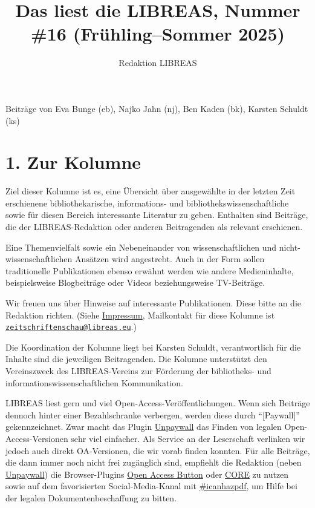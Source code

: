 \documentclass[a4paper,
fontsize=11pt,
oneside,
numbers=noperiodatend,
parskip=half-,
bibliography=totoc,
final
]{scrartcl}
\title{\LARGE{Das liest die LIBREAS, Nummer \#16 (Frühling–Sommer 2025)}}%
\author{Redaktion LIBREAS} %
\date{}
\begin{document}
\maketitle
\thispagestyle{fancyplain} 


Beiträge von Eva Bunge (eb), Najko Jahn (nj), Ben Kaden (bk), Karsten
Schuldt (ks)

\section{1. Zur Kolumne}\label{zur-kolumne}

Ziel dieser Kolumne ist es, eine Übersicht über ausgewählte in der
letzten Zeit erschienene bibliothekarische, informations- und
bibliothekswissenschaftliche sowie für diesen Bereich interessante
Literatur zu geben. Enthalten sind Beiträge, die der LIBREAS-Redaktion
oder anderen Beitragenden als relevant erschienen.

Eine Themenvielfalt sowie ein Nebeneinander von wissenschaftlichen und
nicht-wissenschaftlichen Ansätzen wird angestrebt. Auch in der Form
sollen traditionelle Publikationen ebenso erwähnt werden wie andere
Medieninhalte, beispielsweise Blogbeiträge oder Videos beziehungsweise
TV-Beiträge.

Wir freuen uns über Hinweise auf interessante Publikationen. Diese bitte
an die Redaktion richten. (Siehe
\href{http://libreas.eu/about/}{Impressum}, Mailkontakt für diese
Kolumne ist
\href{mailto:zeitschriftenschau@libreas.eu}{\nolinkurl{zeitschriftenschau@libreas.eu}}.)

Die Koordination der Kolumne liegt bei Karsten Schuldt, verantwortlich
für die Inhalte sind die jeweiligen Beitragenden. Die Kolumne
unterstützt den Vereinszweck des LIBREAS-Vereins zur Förderung der
bibliotheks- und informationswissenschaftlichen Kommunikation.

LIBREAS liest gern und viel Open-Access-Veröffentlichungen. Wenn sich
Beiträge dennoch hinter einer Bezahlschranke verbergen, werden diese
durch \enquote{{[}Paywall{]}} gekennzeichnet. Zwar macht das Plugin
\href{http://unpaywall.org/}{Unpaywall} das Finden von legalen
Open-Access-Versionen sehr viel einfacher. Als Service an der
Leserschaft verlinken wir jedoch auch direkt OA-Versionen, die wir vorab
finden konnten. Für alle Beiträge, die dann immer noch nicht frei
zugänglich sind, empfiehlt die Redaktion (neben
\href{http://unpaywall.org/}{Unpaywall}) die Browser-Plugins
\href{https://openaccessbutton.org/}{Open Access Button} oder
\href{https://core.ac.uk/services/discovery/}{CORE} zu nutzen sowie auf
dem favorisierten Social-Media-Kanal mit
\href{https://mastodon.social/tags/icanhazpdf}{\#icanhazpdf}, um Hilfe
bei der legalen Dokumentenbeschaffung zu bitten.
\end{document}
